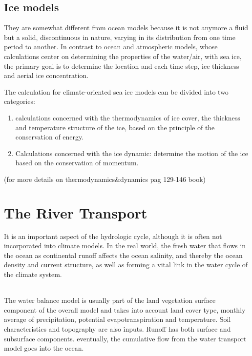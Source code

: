\section{Ice models}

They are somewhat different from ocean models because it is not anymore a fluid but a solid, discontinuous in nature, varying in its distribution from one time period to another. In contrast to ocean and atmospheric models, whose calculations center on determining the properties of the water/air, with sea ice, the primary goal is to determine the location and each time step, ice thickness and aerial ice concentration.



The calculation for climate-oriented sea ice models can be divided into two categories:

\begin{enumerate}
	\item calculations concerned with the thermodynamics of ice cover, the thickness and temperature structure of the ice, based on the principle of the conservation of energy.
	\item Calculations concerned with the ice dynamic: determine the motion of the ice based on the conservation of momentum.
\end{enumerate}
(for more details on thermodynamics\&dynamics pag 129-146 book)

\chapter{The River Transport}

It is an important aspect of the hydrologic cycle, although it is often not incorporated into climate models. In the real world, the fresh water that flows in the ocean as continental runoff affects the ocean salinity, and thereby the ocean density and current structure, as well as forming a vital link in the water cycle of the climate system.


\\

The water balance model is usually  part of the land vegetation surface component of the overall model and takes into account land cover type, monthly average of precipitation, potential evapotranspiration and temperature. Soil characteristics and topography are also inputs. Runoff has both surface and subsurface components. eventually, the cumulative flow from the water transport model goes into the ocean.

